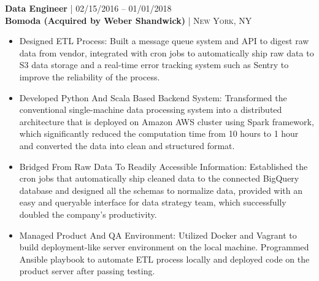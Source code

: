 {\raggedright\normalsize
\textbf{Data Engineer} {\hfill\footnotesize\textsc{| 02/15/2016 -- 01/01/2018}}\\ 
\textbf{Bomoda (Acquired by Weber Shandwick)} {\hfill\footnotesize\textsc{| New York, NY}}}

\begin{itemize}[leftmargin=*, topsep=2pt, partopsep=2.5pt]
\setlength\itemsep{1pt}

\item Designed ETL Process: Built a message queue system and API to digest raw data from vendor, integrated with cron jobs to automatically ship raw data to S3 data storage and a real-time error tracking system such as Sentry to improve the reliability of the process.

\item Developed Python And Scala Based Backend System: Transformed the conventional single-machine data processing system into a distributed architecture that is deployed on Amazon AWS cluster using Spark framework, which significantly reduced the computation time from 10 hours to 1 hour and converted the data into clean and structured format.

\item Bridged From Raw Data To Readily Accessible Information: Established the cron jobs that automatically ship cleaned data to the connected BigQuery database and designed all the schemas to normalize data, provided with an easy and queryable interface for data strategy team, which successfully doubled the company's productivity.

\item Managed Product And QA Environment: Utilized Docker and Vagrant to build deployment-like server environment on the local machine. Programmed Ansible playbook to automate ETL process locally and deployed code on the product server after passing testing.

\end{itemize}
